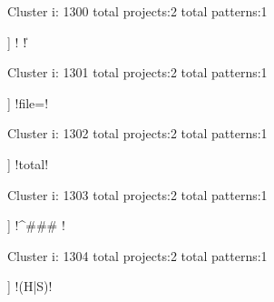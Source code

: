 Cluster i: 1300
total projects:2
total patterns:1
\begin{multicols}{1}
\begin{description}[noitemsep,topsep=0pt]
\item [[2] ] \cverb! \| !
\end{description}
\end{multicols}







Cluster i: 1301
total projects:2
total patterns:1
\begin{multicols}{1}
\begin{description}[noitemsep,topsep=0pt]
\item [[2] ] \cverb!file=!
\end{description}
\end{multicols}







Cluster i: 1302
total projects:2
total patterns:1
\begin{multicols}{1}
\begin{description}[noitemsep,topsep=0pt]
\item [[2] ] \cverb!total!
\end{description}
\end{multicols}







Cluster i: 1303
total projects:2
total patterns:1
\begin{multicols}{1}
\begin{description}[noitemsep,topsep=0pt]
\item [[2] ] \cverb!^### !
\end{description}
\end{multicols}







Cluster i: 1304
total projects:2
total patterns:1
\begin{multicols}{1}
\begin{description}[noitemsep,topsep=0pt]
\item [[2] ] \cverb!(H|S)!
\end{description}
\end{multicols}







